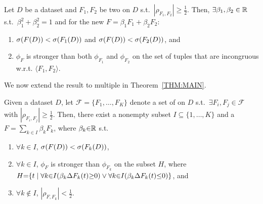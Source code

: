 \begin{lemma}\label{LEMMA:MAIN}
    Let $D$ be a dataset and $F_1,F_2$ be two \views on $D$ s.t.\ $|\rho_{F_1,F_2}| \geq \frac{1}{2}$.
    Then, $\exists \beta_1, \beta_2 \in {\mathbb{R}}$ s.t.\ $\beta_1^2 + \beta_2^2 = 1$ and for the new \view
    $F = \beta_1 F_1 + \beta_2 F_2$:
	 \begin{enumerate}[label=(\arabic*)]
	     \item ${\mathtt{\sigma}}(F(D)) < {\mathtt{\sigma}}(F_1(D))$ and ${\mathtt{\sigma}}(F(D)) < {\mathtt{\sigma}}(F_2(D))$, and
         \item $\phi_F$ is stronger than both $\phi_{F_1}$ and $\phi_{F_2}$
     on the set of tuples that are incongruous w.r.t. $\!\langle F_1,
     F_2\rangle$.
	 \end{enumerate} 
\end{lemma}
%

\noindent We now extend the result to multiple \views in Theorem~\ref{THM:MAIN}.
%

\begin{theorem}\label{THM:MAIN}
    Given a dataset $D$, let $\mathcal{F} {=} \{F_1,\ldots,F_K\}$ denote a set of \views on $D$
    s.t.\ $\exists F_i,F_j{ \in }\mathcal{F}$ with $|\rho_{F_i,F_j}| {\geq} \frac{1}{2}$.
    Then, there exist a nonempty subset $I {\subseteq} \{1,\ldots,K\}$ and a \view
    $F {=} \sum_{k\in I} \beta_k F_k$, where $\beta_k {\in} {\mathbb{R}}$ s.t.
    \begin{enumerate}[label=(\arabic*)]
        \item $\forall k\in I$, ${\mathtt{\sigma}}(F(D)) < {\mathtt{\sigma}}(F_k(D))$,
        \item $\forall k\in I$, $\phi_F$ is stronger than $\phi_{F_k}$ on the subset $H$, where\\ 
	$H {=} \{t \mid 
		\forall {k{\in} I} (\beta_k {\Delta{F_k}({t})} {\geq} 0) \vee 
		\forall {k{\in} I} (\beta_k {\Delta{F_k}({t})} {\leq} 0)\}$, and
        \item $\forall k\not\in I$, $|\rho_{F,F_k}| < \frac{1}{2}$.
    \end{enumerate}
\end{theorem}



